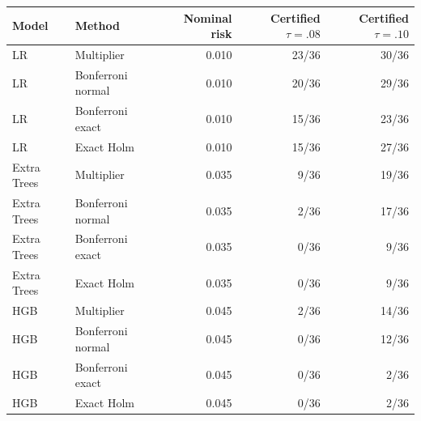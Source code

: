 \begin{tabular}{llrrr}
\toprule
Model & Method & Nominal risk & Certified $\tau=.08$ & Certified $\tau=.10$ \\
\midrule
LR & Multiplier & 0.010 & 23/36 & 30/36 \\
LR & Bonferroni normal & 0.010 & 20/36 & 29/36 \\
LR & Bonferroni exact & 0.010 & 15/36 & 23/36 \\
LR & Exact Holm & 0.010 & 15/36 & 27/36 \\
Extra Trees & Multiplier & 0.035 & 9/36 & 19/36 \\
Extra Trees & Bonferroni normal & 0.035 & 2/36 & 17/36 \\
Extra Trees & Bonferroni exact & 0.035 & 0/36 & 9/36 \\
Extra Trees & Exact Holm & 0.035 & 0/36 & 9/36 \\
HGB & Multiplier & 0.045 & 2/36 & 14/36 \\
HGB & Bonferroni normal & 0.045 & 0/36 & 12/36 \\
HGB & Bonferroni exact & 0.045 & 0/36 & 2/36 \\
HGB & Exact Holm & 0.045 & 0/36 & 2/36 \\
\bottomrule
\end{tabular}
